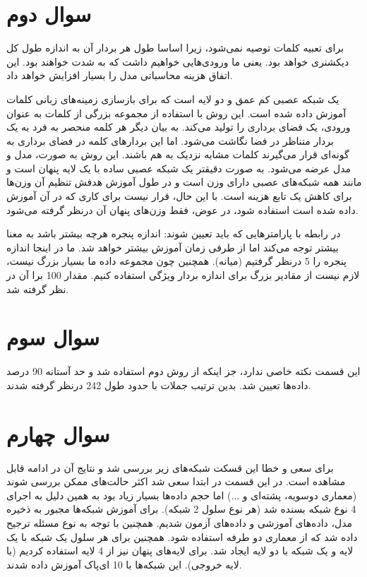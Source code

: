 \documentclass{article}
\begin{document}
\section{سوال دوم}
 برای تعبیه کلمات توصیه نمی‌شود، زیرا اساسا طول هر بردار آن به اندازه طول کل دیکشنری خواهد بود. یعنی ما ورودی‌هایی خواهیم داشت که به شدت  خواهند بود. این اتفاق هزینه محاسباتی مدل را بسیار افزایش خواهد داد.

 یک شبکه عصبی کم عمق و دو لایه است که برای بازسازی زمینه‌های زبانی کلمات آموزش داده شده است. این روش با استفاده از مجموعه بزرگی از کلمات به عنوان ورودی، یک فضای برداری را تولید می‌کند. به بیان دیگر هر کلمه منحصر به فرد به یک بردار متناظر در فضا نگاشت می‌شود. اما این بردارهای کلمه در فضای برداری به گونه‌ای قرار می‌گیرند کلمات مشابه نزدیک به هم باشند. 
این روش به صورت، مدل  و مدل  عرضه می‌شود. به صورت دقیقتر  یک شبکه عصبی ساده با یک لایه پنهان است و مانند همه شبکه‌های عصبی دارای وزن است و در طول آموزش هدفش تنظیم آن وزن‌ها برای کاهش یک تابع هزینه است. با این حال،  قرار نیست برای کاری که در آن آموزش داده شده است استفاده شود، در عوض، فقط وزن‌های پنهان آن درنظر گرفته می‌شود.

در رابطه با پارامترهایی که باید تعیین شوند: اندازه پنجره هرچه بیشتر باشد به معنا بیشتر توجه می‌کند اما از طرفی زمان آموزش بیشتر خواهد شد. ما در اینجا اندازه پنجره را 5 درنظر گرفتیم (میانه). همچنین چون مجموعه داده ما بسیار بزرگ نیست، لازم نیست از مقادیر بزرگ برای اندازه بردار ویژگی استفاده کنیم. مقدار 100 برا آن در نظر گرفته شد. 


\section{سوال سوم}

این قسمت نکته خاصی ندارد، جز اینکه از روش دوم استفاده شد و حد آستانه 90 درصد داده‌ها تعیین شد. بدین ترتیب جملات با حدود طول 242 درنظر گرفته شدند.



\section{سوال چهارم}


برای سعی و خطا این قسکت شبکه‌های زیر بررسی شد و نتایج آن در ادامه قابل مشاهده است. در این قسمت در ابتدا سعی شد اکثر حالت‌های ممکن بررسی شوند (معماری دوسویه، پشته‌ای و ...) اما حجم داده‌ها بسیار زیاد بود به همین دلیل به اجرای 4 نوع شبکه بسنده شد (هر نوع سلول 2 شبکه). برای آموزش شبکه‌ها مجبور به ذخیره مدل، داده‌های آموزشی و داده‌های آزمون شدیم. همچنین با توجه به نوع مسئله ترجیح داده شد که از معماری دو طرفه استفاده شود. همچنین برای هر سلول یک شبکه با یک لایه و یک شبکه با دو لایه ایجاد شد. برای لایه‌های پنهان نیز از 4 لایه استفاده کردیم (با لایه خروجی). این شبکه‌ها با 10 ای‌پاک آموزش داده شدند.
\end{document}
